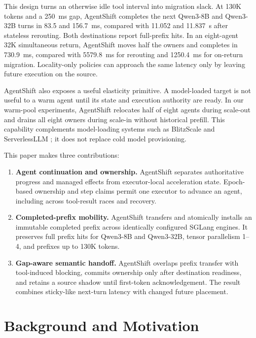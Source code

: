 This design turns an otherwise idle tool interval into migration slack. At 130K tokens and a 250~ms gap, AgentShift completes the next Qwen3-8B and Qwen3-32B turns in 83.5 and 156.7~ms, compared with 11.052 and 11.837~s after stateless rerouting. Both destinations report full-prefix hits. In an eight-agent 32K simultaneous return, AgentShift moves half the owners and completes in 730.9~ms, compared with 5579.8~ms for rerouting and 1250.4~ms for on-return migration. Locality-only policies can approach the same latency only by leaving future execution on the source.

AgentShift also exposes a useful elasticity primitive. A model-loaded target is not useful to a warm agent until its state and execution authority are ready. In our warm-pool experiments, AgentShift relocates half of eight agents during scale-out and drains all eight owners during scale-in without historical prefill. This capability complements model-loading systems such as BlitzScale and ServerlessLLM \cite{blitzscale, serverlessllm}; it does not replace cold model provisioning.

This paper makes three contributions:

\begin{enumerate}
\def\labelenumi{\arabic{enumi}.}
\tightlist
\item
  \textbf{Agent continuation and ownership.} AgentShift separates authoritative progress and managed effects from executor-local acceleration state. Epoch-based ownership and step claims permit one executor to advance an agent, including across tool-result races and recovery.
\item
  \textbf{Completed-prefix mobility.} AgentShift transfers and atomically installs an immutable completed prefix across identically configured SGLang engines. It preserves full prefix hits for Qwen3-8B and Qwen3-32B, tensor parallelism 1--4, and prefixes up to 130K tokens.
\item
  \textbf{Gap-aware semantic handoff.} AgentShift overlaps prefix transfer with tool-induced blocking, commits ownership only after destination readiness, and retains a source shadow until first-token acknowledgement. The result combines sticky-like next-turn latency with changed future placement.
\end{enumerate}

\section{Background and Motivation}\label{background-and-motivation}

